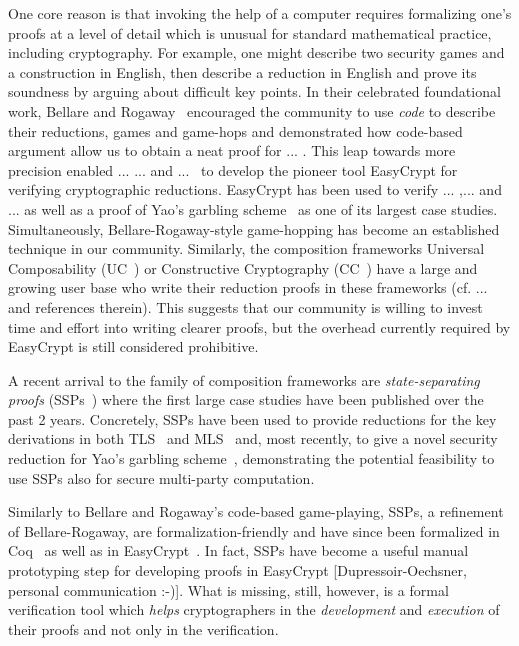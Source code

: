 One core reason is that invoking the help of a computer requires formalizing one's proofs at a level of detail which is unusual for standard mathematical practice, including cryptography. For example, one might describe two security games and a construction in English, then describe a reduction in English and prove its soundness by arguing about difficult key points. In their celebrated foundational work, Bellare and Rogaway~\cite{X} encouraged the community to use \emph{code} to describe their reductions, games and game-hops and demonstrated how code-based argument allow us to obtain a neat proof for ... . This leap towards more precision enabled ... ... and ...~\cite{X} to develop the pioneer tool EasyCrypt for verifying cryptographic reductions. EasyCrypt has been used to verify ... ,... and ... as well as a proof of Yao's garbling scheme~\cite{X} as one of its largest case studies. Simultaneously, Bellare-Rogaway-style game-hopping has become an established technique in our community. Similarly, the composition frameworks Universal Composability (UC~\cite{X}) or Constructive Cryptography (CC~\cite{X}) have a large and growing user base who write their reduction proofs in these frameworks (cf. ... and references therein). This suggests that our community is willing to invest time and effort into writing clearer proofs, but the overhead currently required by EasyCrypt is still considered prohibitive. 

A recent arrival to the family of composition frameworks are \emph{state-separating proofs} (SSPs~\cite{X}) where the first large case studies have been published over the past 2 years. Concretely, SSPs have been used to provide reductions for the key derivations in both TLS~\cite{X} and MLS~\cite{X} and, most recently, to give a novel security reduction for Yao's garbling scheme~\cite{X}, demonstrating the potential feasibility to use SSPs also for secure multi-party computation.

Similarly to Bellare and Rogaway's code-based game-playing, SSPs, a refinement of Bellare-Rogaway, are formalization-friendly and have since been formalized in Coq~\cite{X} as well as in EasyCrypt~\cite{X}. In fact, SSPs have become a useful manual prototyping step for developing proofs in EasyCrypt [Dupressoir-Oechsner, personal communication :-)]. What is missing, still, however, is a formal verification tool which \emph{helps} cryptographers in the \emph{development} and \emph{execution} of their proofs and not only in the verification.

